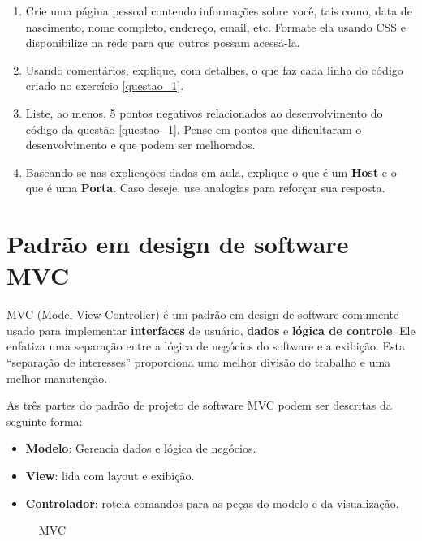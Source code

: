 \begin{enumerate}[leftmargin=1.7cm]
	\setlength\itemsep{0em}
	\item \label{questao_1} Crie uma página pessoal contendo informações sobre você, tais como, data de nascimento, nome completo, endereço, email, etc. Formate ela usando CSS e disponibilize na rede para que outros possam acessá-la. 
	
	\item Usando comentários, explique, com detalhes, o que faz cada linha do código criado no exercício \ref{questao_1}. 
	
	\item Liste, ao menos, 5 pontos negativos relacionados ao desenvolvimento do código da questão \ref{questao_1}. Pense em pontos que dificultaram o desenvolvimento e que podem ser melhorados.  
	
	\item Baseando-se nas explicações dadas em aula, explique o que é um \textbf{Host} e o que é uma \textbf{Porta}. Caso deseje, use analogias para reforçar sua resposta.
\end{enumerate}

\section{Padrão em design de software MVC}

MVC (Model-View-Controller) é um padrão em design de software comumente usado para implementar \textbf{interfaces} de usuário, \textbf{dados} e \textbf{lógica de controle}. Ele enfatiza uma separação entre a lógica de negócios do software e a exibição. Esta ``separação de interesses'' proporciona uma melhor divisão do trabalho e uma melhor manutenção.

As três partes do padrão de projeto de software MVC podem ser descritas da seguinte forma:

\begin{itemize}[leftmargin=1.7cm]
	\setlength\itemsep{0em}
	\item \textbf{Modelo}: Gerencia dados e lógica de negócios.
	\item \textbf{View}: lida com layout e exibição.
	\item \textbf{Controlador}: roteia comandos para as peças do modelo e da visualização.
\end{itemize}

\begin{figure}[H]
	\centering
	\caption{MVC}
	\label{fig:mvc}
\end{figure}

